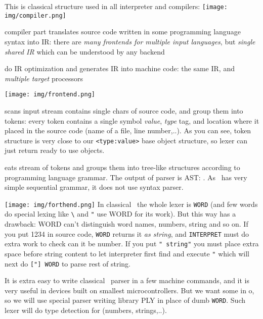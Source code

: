 \clearpage{}

This is classical structure used in all interpreter and compilers:
\noindent
\texttt{[image: img/compiler.png]}
\begin{description}[nosep]
\item[frontend] compiler part translates source code written in some programming
language syntax into IR: there are \emph{many frontends for multiple input
languages}, but \emph{single shared IR} which can be understood by any backend
\item[backend] do IR optimization and generates IR into machine code: the same
IR, and \emph{multiple target} processors
\end{description}

\clearpage\noindent\texttt{[image: img/frontend.png]} 
\begin{description}[nosep]
\item[lexer] scans input stream contains single chars of source code, and group
them into tokens: every token contains a single symbol \emph{value}, \emph{type}
tag, and location where it placed in the source code (name of a file, line
number,..). As you can see, token structure is very close to our
\verb|<type:value>| base object structure, so lexer can just return ready to use
objects.
\item[parser] eats stream of tokens and groups them into tree-like structures
according to programming language grammar. The output of parser is AST:
. As \F\ has very simple sequential grammar, it does
not use syntax parser.
\end{description}

\clearpage{}\label{lexer}
\noindent\texttt{[image: img/forthend.png]} 
In classical \F\ the whole lexer is \verb|WORD| (and few words do special
lexing like \verb|\| and \verb|"| use WORD for its work). But this way has a
drawback: WORD can't distinguish word names, numbers, string and so on. If you
put 1234 in source code, \verb|WORD| returns it \emph{as string}, and
\verb|INTERPRET| must do extra work to check can it be number. If you put
\verb|" string"| you must place extra space before string content to let
interpreter first find and execute \verb|"| which will next do \verb|["] WORD|
to parse rest of string.

It is
extra easy to write classical \F\ parser in a few machine commands, and it
is very useful in devices built on smallest microcontrollers.
But we want some  in o\F{}, so we will use special parser writing library
PLY in place of dumb \verb|WORD|. Such
lexer will do type detection for  (numbers, strings,..).

